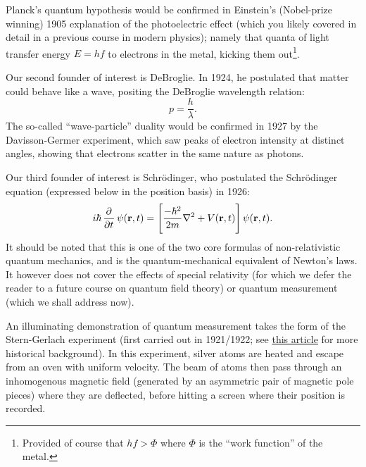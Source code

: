 Planck's quantum hypothesis would be confirmed in Einstein's (Nobel-prize winning) 1905 explanation of the photoelectric effect (which you likely covered in detail in a previous course in modern physics); namely that quanta of light transfer energy $E = hf$ to electrons in the metal, kicking them out\footnote{Provided of course that $hf > \Phi$ where $\Phi$ is the ``work function'' of the metal.}.

Our second founder of interest is DeBroglie. In 1924, he postulated that matter could behave like a wave, positing the DeBroglie wavelength relation:
\begin{equation}
    p = \frac{h}{\lambda}.
\end{equation}
The so-called ``wave-particle'' duality would be confirmed in 1927 by the Davisson-Germer experiment, which saw peaks of electron intensity at distinct angles, showing that electrons scatter in the same nature as photons.

Our third founder of interest is Schr\"{o}dinger, who postulated the Schr\"{o}dinger equation (expressed below in the position basis) in 1926:
\begin{equation}
    i\hbar \dpd{}{t}\psi(\v{r}, t) = \left[\frac{-\hbar^2}{2m}\nabla^2 + V(\v{r}, t)\right] \psi(\v{r}, t).
\end{equation}
It should be noted that this is one of the two core formulas of non-relativistic quantum mechanics, and is the quantum-mechanical equivalent of Newton's laws. It however does not cover the effects of special relativity (for which we defer the reader to a future course on quantum field theory) or quantum measurement (which we shall address now). 

An illuminating demonstration of quantum measurement takes the form of the Stern-Gerlach experiment (first carried out in 1921/1922; see \href{https://physicstoday.scitation.org/doi/10.1063/1.1650229}{this article} for more historical background). In this experiment, silver atoms are heated and escape from an oven with uniform velocity. The beam of atoms then pass through an inhomogenous magnetic field (generated by an asymmetric pair of magnetic pole pieces) where they are deflected, before hitting a screen where their position is recorded. 


